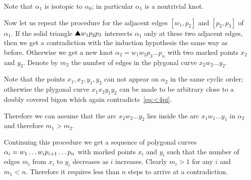 Note that $\alpha_1$ is isotopic to $\alpha_0$;
in particular $\alpha_1$ is a nontrivial knot.

Now let us repeat the procedure for the adjacent edges $[w_1,p_2]$ and $[p_2,p_3]$ of $\alpha_1$.
If the solid triangle $\solidtriangle w_1p_2p_3$ intersects $\alpha_1$ only at these two adjacent edges, then we get a contradiction with the induction hypothesis the same way as before.
Otherwise we get a new knot $\alpha_2=w_1w_2p_3\dots p_n$ with two marked points $x_2$ and $y_2$.
Denote by $m_2$ the number of edges in the plygonal curve $x_2w_2\dots y_2$.

Note that the points $x_1,x_2,y_1,y_2$ can not appear on $\alpha_2$ in the same cyclic order;
otherwise the plygonal curve $x_1x_2y_1y_2$ can be made to be arbitrary close to a doubly covered bigon which again contradicts~\ref{eq:<4pi}.

Therefore we can assume that the arc $x_2w_2\dots y_2$ lies inside the arc $x_1w_1\dots y_1$ in $\alpha_2$
and therefore $m_1>m_2$.

Continuing this procedure we get a sequence of polygonal curves $\alpha_i\z=w_1\dots w_i p_{i+1}\dots p_n$ with marked points $x_i$ and $y_i$ such that the number of edges $m_i$ from $x_i$ to $y_i$ decreases as $i$ increases.
Clearly $m_i>1$ for any $i$ and $m_1<n$.
Therefore it requires less than $n$ steps to arrive at a contradiction.
\qeds
